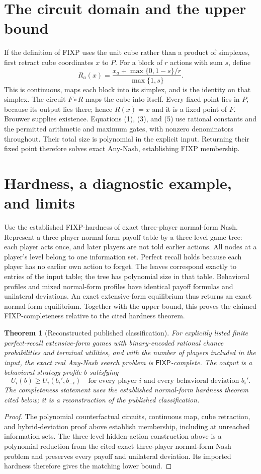 \documentclass[11pt]{article}
\newtheorem{theorem}{Theorem}
\begin{document}
\section*{The circuit domain and the upper bound}
If the definition of FIXP uses the unit cube rather than a product of
simplexes, first retract cube coordinates $x$ to $P$. For a block of $r$
actions with sum $s$, define
\[
 R_a(x)=\frac{x_a+\max\{0,1-s\}/r}{\max\{1,s\}}.                  \tag{5}
\]
This is continuous, maps each block into its simplex, and is the identity
on that simplex. The circuit $F\circ R$ maps the cube into itself.
Every fixed point lies in $P$, because its output lies there; hence
$R(x)=x$ and it is a fixed point of $F$. Brouwer supplies existence.
Equations (1), (3), and (5) use rational constants and the permitted
arithmetic and maximum gates, with nonzero denominators throughout.
Their total size is polynomial in the explicit input. Returning their
fixed point therefore solves exact Any-Nash, establishing FIXP membership.

\section*{Hardness, a diagnostic example, and limits}
Use the established FIXP-hardness of exact three-player normal-form Nash.
Represent a three-player normal-form payoff table by a three-level game
tree: each player acts once, and later players are not told earlier
actions. All nodes at a player's level belong to one information set.
Perfect recall holds because each player has no earlier own action to
forget. The leaves correspond exactly to entries of the input table;
the tree has polynomial size in that table. Behavioral profiles and mixed
normal-form profiles have identical payoff formulas and unilateral
deviations. An exact extensive-form equilibrium thus returns an exact
normal-form equilibrium. Together with the upper bound, this proves the
claimed FIXP-completeness relative to the cited hardness theorem.

\begin{theorem}[Reconstructed published classification]
For explicitly listed finite perfect-recall extensive-form games with
binary-encoded rational chance probabilities and terminal utilities,
and with the number of players included in the input, the exact real
Any-Nash search problem is $\mathsf{FIXP}$-complete. The output is a
behavioral strategy profile $b$ satisfying
\[
 U_i(b)\geq U_i(b_i',b_{-i})
 \quad\text{for every player }i\text{ and every behavioral deviation }b_i'.
\]
The completeness statement uses the established normal-form hardness
theorem cited below; it is a reconstruction of the published classification.
\end{theorem}
\begin{proof}
The polynomial counterfactual circuits, continuous map, cube retraction,
and hybrid-deviation proof above establish membership, including at
unreached information sets. The three-level hidden-action construction
above is a polynomial reduction from the cited exact three-player
normal-form Nash problem and preserves every payoff and unilateral
deviation. Its imported hardness therefore gives the matching lower bound.
\end{proof}
\end{document}
